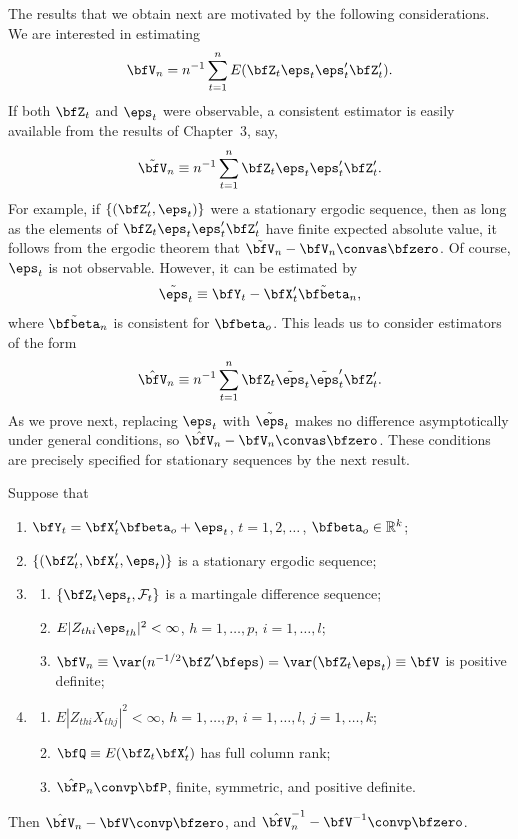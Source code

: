 The results that we obtain next are motivated by the following considerations. We are interested in estimating
\[
  \bfV_n = n^{-1}\sum_{t=1}^{n}E(\bfZ_t\eps_t\eps_t'\bfZ_t').
\]
If both $\bfZ_t$ and $\eps_t$ were observable, a consistent estimator is easily available from the results of Chapter~3, say,
\[
  \tilde{\bfV}_n \equiv n^{-1}\sum_{t=1}^{n}\bfZ_t\eps_t\eps_t'\bfZ_t'.
\]
For example, if $\{(\bfZ_t',\eps_t)\}$ were a stationary ergodic sequence, then as long as the elements of $\bfZ_t\eps_t\eps_t'\bfZ_t'$ have finite expected absolute value, it follows from the ergodic theorem that $\tilde{\bfV}_n - \bfV_n \convas \bfzero$. Of course, $\eps_t$ is not observable. However, it can be estimated by
\[
  \tilde{\eps}_t \equiv \bfY_t - \bfX_t'\tilde{\bfbeta}_n,
\]
where $\tilde{\bfbeta}_n$ is consistent for $\bfbeta_o$. This leads us to consider estimators of the form
\[
  \hat{\bfV}_n \equiv n^{-1}\sum_{t=1}^{n}\bfZ_t\tilde{\eps}_t\tilde{\eps}_t'\bfZ_t'.
\]
As we prove next, replacing $\eps_t$ with $\tilde{\eps}_t$ makes no difference asymptotically under general conditions, so $\hat{\bfV}_n - \bfV_n \convas \bfzero$. These conditions are precisely specified for stationary sequences by the next result.

\begin{theorem}\label{thm:6.3}
Suppose that
\begin{enumerate}[label=(\roman*)]
  \item $\bfY_t = \bfX_t'\bfbeta_o + \eps_t$, \quad $t = 1,2,\ldots$\,, \quad $\bfbeta_o \in \mathbb{R}^k$;
  \item $\{(\bfZ_t',\bfX_t',\eps_t)\}$ is a stationary ergodic sequence;
  \item\begin{enumerate}[label=(\alph*)]
    \item $\{\bfZ_t\eps_t,\mathcal{F}_t\}$ is a martingale difference sequence;
    \item $E|Z_{thi}\eps_{th}|^2 < \infty$, $h = 1,\ldots,p$, $i = 1,\ldots,l$;
    \item $\bfV_n \equiv \var(n^{-1/2}\bfZ'\bfeps) = \var(\bfZ_t\eps_t) \equiv \bfV$ is positive definite;
  \end{enumerate}
  \item\begin{enumerate}[label=(\alph*)]
    \item $E|Z_{thi}X_{thj}|^2 < \infty$, $h = 1,\ldots,p$, $i = 1,\ldots,l$, $j = 1,\ldots,k$;
    \item $\bfQ \equiv E(\bfZ_t\bfX_t')$ has full column rank;
    \item $\hat{\bfP}_n \convp \bfP$, finite, symmetric, and positive definite.
  \end{enumerate}
\end{enumerate}
Then $\hat{\bfV}_n - \bfV \convp \bfzero$, and $\hat{\bfV}_n^{-1} - \bfV^{-1} \convp \bfzero$.
\end{theorem}


